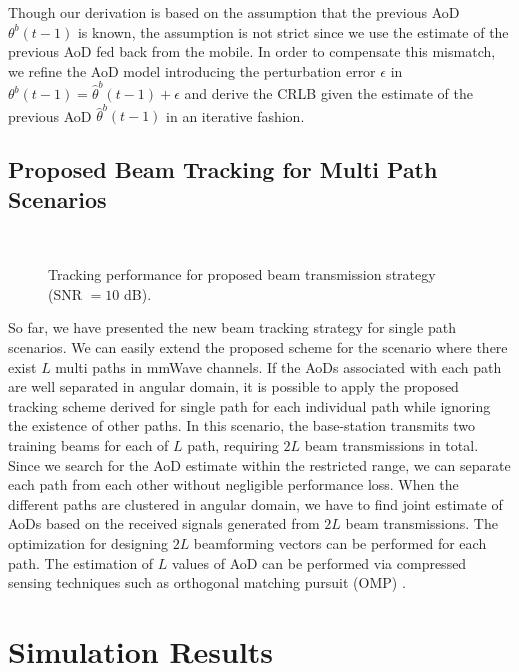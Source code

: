 \documentclass[conference]{IEEEtran}
\begin{document}
Though our derivation is based on the assumption that the previous AoD $\theta^{b}(t-1)$ is known, the assumption is not strict since we use the estimate of the previous AoD fed back from the mobile.  In order to compensate this mismatch, we refine the AoD model introducing the perturbation error $\epsilon$ in  $\theta^{b}(t-1) = \hat{\theta}^{b}(t-1) + \epsilon$ and derive the CRLB given the estimate of the previous AoD $\hat{\theta}^{b}(t-1)$ in an iterative fashion.

\subsection{Proposed Beam Tracking for Multi Path Scenarios}

\begin{figure} [t]
 \centering
 \\
 \caption{Tracking performance for proposed beam transmission strategy (SNR $= 10$ dB).}\label{fig:tracking_performance}
\end{figure}

So far, we have presented the new beam tracking strategy for single path scenarios. We can easily extend the proposed scheme for the scenario where there exist $L$ multi paths in mmWave channels. If the AoDs associated with each path are well separated in angular domain, it is possible to apply the proposed tracking scheme derived for single path for each individual path while ignoring the existence of other paths. In this scenario, the base-station transmits two training beams for each of $L$ path, requiring $2L$ beam transmissions in total. Since we search for the AoD estimate within the restricted range, we can separate each path from each other without negligible performance loss.  When the different paths are clustered in angular domain, we have to find joint estimate of AoDs based on the received signals generated from $2L$ beam transmissions. The optimization for designing $2L$ beamforming vectors can be performed for each path. The estimation of $L$ values of AoD can be performed via compressed sensing techniques such as orthogonal matching pursuit (OMP) \cite{ref:OMP}.

\section{Simulation Results} \label{sec_sim_result}
\end{document}
